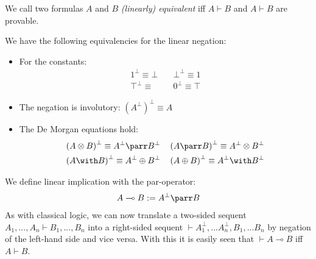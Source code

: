 \documentclass[DIN, pagenumber=false, fontsize=11pt, parskip=half, colorinlistoftodos, svgnames]{scrartcl}
\begin{document}
	
	\begin{definition}
		We call two formulas $A$ and $B $ \emph{(linearly) equivalent} iff $A \vdash B$ and $A \vdash B $ are provable.
	\end{definition}
	
	
	\begin{theorem}
		We have the following equivalencies for the linear negation:
		\begin{itemize}
			\item For the constants: 
			\begin{align*}
				1^\bot \equiv \bot \quad 
				& 
				\bot^\bot \equiv 1 
				\\
				\top^\bot \equiv \quad 
				& 
				0^\bot \equiv \top
			\end{align*}
			\item The negation is involutory: 
			$(A^\bot)^\bot \equiv A $
			\item The De Morgan equations hold:
			\begin{align*}
				\left(A \otimes B\right)^\bot \equiv A^\bot \parr B^\bot 
				\quad
				&
				\left(A \parr B\right)^\bot \equiv A^\bot \otimes B^\bot 
				\\
				\left(A \with B\right)^\bot \equiv A^\bot \oplus B^\bot 
				\quad
				&
				\left(A \oplus B\right)^\bot \equiv A^\bot \with B^\bot 
			\end{align*}
		\end{itemize}
		We define linear implication with the par-operator: 
		\begin{align*}
			A \multimap B := A^\bot \parr B
		\end{align*}
		As with classical logic, we can now translate a two-sided sequent 
		$A_1, ..., A_n \vdash B_1, ..., B_n$ 
		into a right-sided sequent 
		$\vdash A_1^\bot, ... A_n^\bot, B_1, ... B_n$ 
		by negation of the left-hand side and vice versa.
		With this it is easily seen that $\vdash A\multimap B$ iff $A \vdash B$.
	\end{theorem}
	
\end{document}
